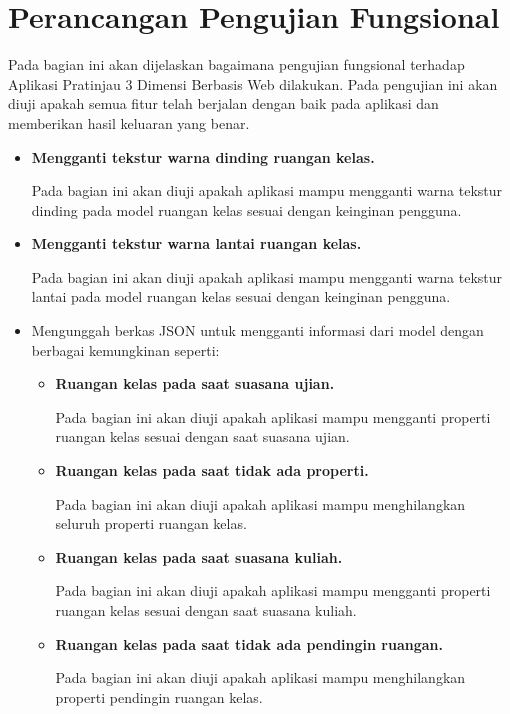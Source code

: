 \section{Perancangan Pengujian Fungsional}
\label{perancanganPengujianFungsional}
Pada bagian ini akan dijelaskan bagaimana pengujian fungsional terhadap Aplikasi Pratinjau 3 Dimensi Berbasis Web dilakukan. Pada pengujian ini akan diuji apakah semua fitur telah berjalan dengan baik pada aplikasi dan memberikan hasil keluaran yang benar.

\begin{itemize}
	\item {\bf Mengganti tekstur warna dinding ruangan kelas.}
	
	Pada bagian ini akan diuji apakah aplikasi mampu mengganti warna tekstur dinding pada model ruangan kelas sesuai dengan keinginan pengguna.
	
	\item {\bf Mengganti tekstur warna lantai ruangan kelas.}
	
	Pada bagian ini akan diuji apakah aplikasi mampu mengganti warna tekstur lantai pada model ruangan kelas sesuai dengan keinginan pengguna.
	
	\item Mengunggah berkas JSON untuk mengganti informasi dari model dengan berbagai kemungkinan seperti:
		\begin{itemize}
			\item {\bf Ruangan kelas pada saat suasana ujian.}
			
			Pada bagian ini akan diuji apakah aplikasi mampu mengganti properti ruangan kelas sesuai dengan saat suasana ujian.
			
			\item {\bf Ruangan kelas pada saat tidak ada properti.}
			
			Pada bagian ini akan diuji apakah aplikasi mampu menghilangkan seluruh properti ruangan kelas.
			
			\item {\bf Ruangan kelas pada saat suasana kuliah.}
			
			Pada bagian ini akan diuji apakah aplikasi mampu mengganti properti ruangan kelas sesuai dengan saat suasana kuliah.
			
			\item {\bf Ruangan kelas pada saat tidak ada pendingin ruangan.}
			
			Pada bagian ini akan diuji apakah aplikasi mampu menghilangkan properti pendingin ruangan kelas.
			

\end{itemize}
\end{itemize}
